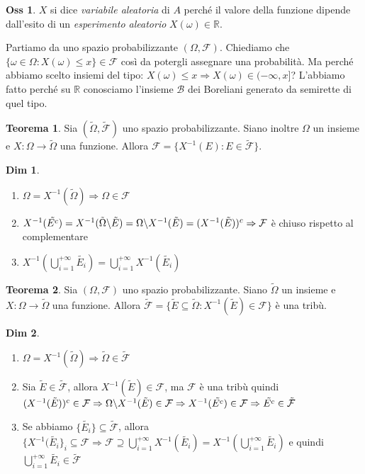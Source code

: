 \documentclass[12pt, a4paper]{report}
\theoremstyle{definition}
\newtheorem{theorem}{Teorema}[section]
\newtheorem*{demonstration}{Dim}
\newtheorem*{observation}{Oss}
\DeclareRobustCommand{\F}{\mathcal{F}}%
\DeclareRobustCommand{\R}{\mathbb{R}}%
\DeclareRobustCommand{\B}{\mathcal{B}}%
\DeclareRobustCommand{\probzspace}{(\Omega,\F)}
\begin{document}
\begin{observation}
	$X$ si dice \emph{variabile aleatoria} di $A$ perché il valore della
	funzione dipende dall'esito di un \emph{esperimento aleatorio}
	\(X(\omega)\in\R\).
\end{observation}

Partiamo da uno spazio probabilizzante $\probzspace$. Chiediamo che \(\{\omega\in
\Omega :X(\omega)\leq x\}\in\F\) così da potergli assegnare una probabilità. Ma 
perché abbiamo scelto insiemi del tipo: \(X(\omega)\leq x \Rightarrow X(\omega)\in
(-\infty,x]\)? L'abbiamo fatto perché su $\R$ conosciamo l'insieme $\B$ dei
Boreliani generato da semirette di quel tipo.

\begin{theorem}
	Sia \((\tilde{\Omega}, \tilde{\F})\) uno spazio probabilizzante. Siano inoltre
	$\Omega$ un insieme e \(X:\Omega\rightarrow\tilde{\Omega}\) una funzione.
	Allora \(\F=\{X^{-1}(E):E\in\tilde{\F}\}\).
\end{theorem}
\begin{demonstration}
	\mbox{}
	\begin{enumerate}
		\item \(\Omega=X^{-1}(\tilde{\Omega})\Rightarrow\Omega\in\F\)
		\item \(X^{-1}(\tilde{E^c})=X^{-1}(\tilde{\Omega}\symbol{92}\tilde{E})=
		\Omega\symbol{92}X^{-1}(\tilde{E})=(X^{-1}(\tilde{E}))^c\Rightarrow\F\)
		è chiuso rispetto al complementare
		\item \(X^{-1}(\bigcup_{i=1}^{+\infty}\tilde{E_i})=\bigcup_{i=1}^{+\infty}
		X^{-1}(\tilde{E_i})\)
	\end{enumerate}
\end{demonstration}

\begin{theorem}
	Sia $\probzspace$ uno spazio probabilizzante. Siano $\tilde{\Omega}$ un
	insieme e \(X:\Omega\rightarrow\tilde{\Omega}\) una funzione. Allora \(\tilde{\F}
	=\{\tilde{E}\subseteq\tilde{\Omega}:X^{-1}(\tilde{E})\in\F\}\) è una tribù.
\end{theorem}
\begin{demonstration}
	\mbox{}
	\begin{enumerate}
		\item \(\Omega=X^{-1}(\tilde{\Omega})\Rightarrow\tilde{\Omega}\in\tilde{\F}\)
		\item Sia \(\tilde{E}\in\tilde{\F}\), allora \(X^{-1}(\tilde{E})\in\F\),
		ma $\F$ è una tribù quindi \((X^{-1}(\tilde{E}))^c\in\F\Rightarrow\Omega
		\symbol{92}X^{-1}(\tilde{E})\in\F\Rightarrow X^{-1}(\tilde{E^c})\in\F
		\Rightarrow\tilde{E^c}\in\tilde{\F}\)
		\item Se abbiamo \(\{\tilde{E_i}\}\subseteq\tilde{\F}\), allora \(\{X^{-1}
		(\tilde{E_i}\}_i\subseteq\F\Rightarrow\F\supseteq\bigcup_{i=1}^{+\infty}
		X^{-1}(\tilde{E_i})=X^{-1}(\bigcup_{i=1}^{+\infty}\tilde{E_i})\) e quindi
		\(\bigcup_{i=1}^{+\infty}\tilde{E_i}\in\tilde{\F}\)
	\end{enumerate}
\end{demonstration}
\end{document}
